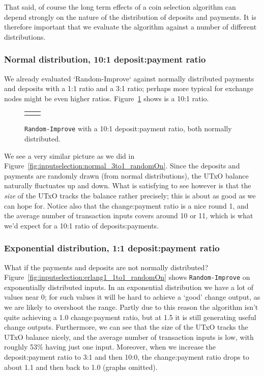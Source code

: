 \documentclass{article}
\theoremstyle{definition}{
  \newtheorem{lemma}{Lemma}[section] %
  \newtheorem{definition}[lemma]{Definition}
}
\theoremstyle{theorem}{
  \newtheorem{invariant}[lemma]{Invariant}
  \newtheorem{proofobligation}[lemma]{Proof Obligation}
}
\numberwithin{equation}{lemma}
\begin{document}
That said, of course the long term effects of a coin selection algorithm
can depend strongly on the nature of the distribution of deposits and payments.
It is therefore important that we evaluate the algorithm against a number
of different distributions.

\subsubsection{Normal distribution, 10:1 deposit:payment ratio}

We already evaluated `Random-Improve` against normally distributed payments and
deposits with a 1:1 ratio and a 3:1 ratio; perhaps more typical for exchange
nodes might be even higher ratios.
Figure~\ref{fig:inputselection:normal_10to1_randomOn} shows is a 10:1 ratio.

\begin{figure}[p]
\begin{center}
\scriptsize
\begin{tabular}{ll}
 &

\end{tabular}
\end{center}
\caption{\label{fig:inputselection:normal_10to1_randomOn}
  \texttt{Random-Improve} with a 10:1 deposit:payment ratio, both normally
  distributed.
}
\end{figure}

We see a very similar picture as we did in
Figure~\ref{fig:inputselection:normal_3to1_randomOn}. Since the deposits and
payments are randomly drawn (from normal distributions), the UTxO balance
naturally fluctuates up and down. What is satisfying to see however is that the
\emph{size} of the UTxO tracks the balance rather precisely; this is about as
good as we can hope for. Notice also that the change:payment ratio is a nice
round 1, and the average number of transaction inputs covers around 10 or 11,
which is what we'd expect for a 10:1 ratio of deposits:payments.

\subsubsection{Exponential distribution, 1:1 deposit:payment ratio}
\label{sec:inputselection:erlang1_1to1_randomOn}

What if the payments and deposits are not normally distributed?
Figure~\ref{fig:inputselection:erlang1_1to1_randomOn} shows
\texttt{Random-Improve} on exponentially distributed inputs. In an exponential
distribution we have a lot of values near 0; for such values it will be hard to
achieve a `good' change output, as we are likely to overshoot the range. Partly
due to this reason the algorithm isn't quite achieving a 1.0 change:payment
ratio, but at 1.5 it is still generating useful change outputs. Furthermore, we
can see that the size of the UTxO tracks the UTxO balance nicely, and the
average number of transaction inputs is low, with roughly 53\% having just one
input. Moreover, when we increase the deposit:payment ratio to 3:1 and then
10:0, the change:payment ratio drops to about 1.1 and then back to 1.0 (graphs
omitted).
\end{document}
